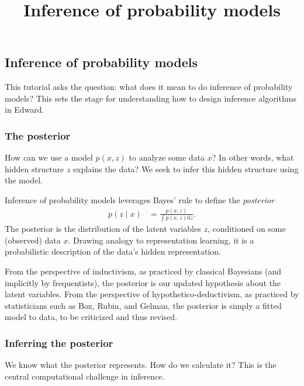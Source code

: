 \title{Inference of probability models}

\subsection{Inference of probability models}

This tutorial asks the question: what does it mean to do inference of
probability models? This sets the stage for understanding how to
design inference algorithms in Edward.

\subsubsection{The posterior}

How can we use a model $p(x,z)$ to analyze some data $x$? In other words,
what hidden structure $z$ explains the data? We seek to infer this
hidden structure using the model.

Inference of probability models leverages Bayes' rule to define the
\emph{posterior}
\begin{align*}
  p(z \mid x)
  &=
  \frac{p(x,z)}{\int p(x,z) \text{d}z}.
\end{align*}
The posterior is the distribution of the latent variables $z$, conditioned on
some (observed) data $x$.
Drawing analogy to representation learning, it is a probabilistic
description of the data's hidden representation.

From the perspective of inductivism, as practiced by classical
Bayesians (and implicitly by frequentists),
the posterior is our updated hypothesis about the latent variables.
From the perspective of hypothetico-deductivism, as practiced by
statisticians such as Box, Rubin, and Gelman, the posterior is simply
a fitted model to data, to be criticized and thus revised.


\subsubsection{Inferring the posterior}

We know what the posterior represents. How do we calculate it? This is the
central computational challenge in inference.

